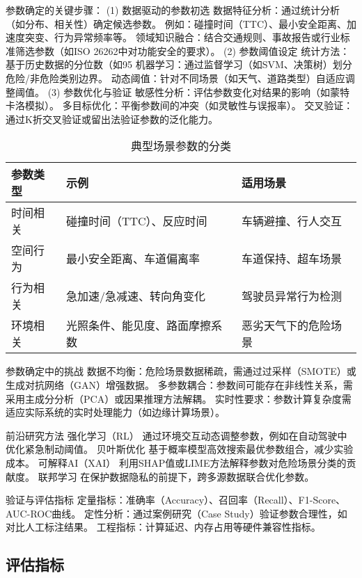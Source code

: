 参数确定的关键步骤：
(1) 数据驱动的参数初选
数据特征分析：通过统计分析（如分布、相关性）确定候选参数。
例如：碰撞时间（TTC）、最小安全距离、加速度突变、行为异常频率等。
领域知识融合：结合交通规则、事故报告或行业标准筛选参数（如ISO 26262中对功能安全的要求）。
(2) 参数阈值设定
统计方法：基于历史数据的分位数（如95%
机器学习：通过监督学习（如SVM、决策树）划分危险/非危险类别边界。
动态阈值：针对不同场景（如天气、道路类型）自适应调整阈值。
(3) 参数优化与验证
敏感性分析：评估参数变化对结果的影响（如蒙特卡洛模拟）。
多目标优化：平衡参数间的冲突（如灵敏性与误报率）。
交叉验证：通过K折交叉验证或留出法验证参数的泛化能力。


\begin{table}[htb]
	\centering
	\caption{典型场景参数的分类}
	\label{T.example}
\begin{tabular}{lll}
	\hline
	参数类型 & 示例  & 适用场景 \\
	\hline
	时间相关 & 碰撞时间（TTC）、反应时间 & 车辆避撞、行人交互 \\
	\hline
	空间行为 & 最小安全距离、车道偏离率 & 车道保持、超车场景 \\
	\hline
	行为相关 & 急加速/急减速、转向角变化 & 驾驶员异常行为检测 \\
	\hline
	环境相关 & 光照条件、能见度、路面摩擦系数 & 恶劣天气下的危险场景 \\
	\hline
\end{tabular}
\end{table}


参数确定中的挑战
数据不均衡：危险场景数据稀疏，需通过过采样（SMOTE）或生成对抗网络（GAN）增强数据。
多参数耦合：参数间可能存在非线性关系，需采用主成分分析（PCA）或因果推理方法解耦。
实时性要求：参数计算复杂度需适应实际系统的实时处理能力（如边缘计算场景）。

前沿研究方法
强化学习（RL）
通过环境交互动态调整参数，例如在自动驾驶中优化紧急制动阈值。
贝叶斯优化
基于概率模型高效搜索最优参数组合，减少实验成本。
可解释AI（XAI）
利用SHAP值或LIME方法解释参数对危险场景分类的贡献度。
联邦学习
在保护数据隐私的前提下，跨多源数据联合优化参数。

验证与评估指标
定量指标：准确率（Accuracy）、召回率（Recall）、F1-Score、AUC-ROC曲线。
定性分析：通过案例研究（Case Study）验证参数合理性，如对比人工标注结果。
工程指标：计算延迟、内存占用等硬件兼容性指标。



\subsection{评估指标}

